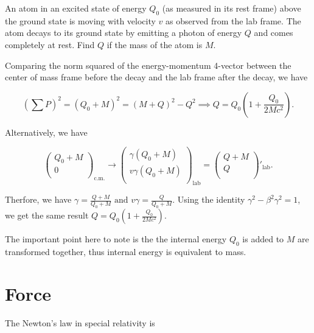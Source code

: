 \documentclass[english,a4paper,12pt]{report}
\begin{document}
{An atom in an excited state of energy \(Q_0 \) (as measured in its rest frame) above the ground state is moving with velocity \(v\) as observed from the lab frame. The atom decays to its ground state by emitting a photon of energy \(Q\) and comes completely at rest. Find \(Q\) if the mass of the atom is \(M\).}
{Comparing the norm squared of the energy-momentum 4-vector between the center of mass frame before the decay and the lab frame after the decay, we have

\begin{equation}
    \left( \sum P \right)^2 = (Q_0 + M)^2 = (M + Q)^2 - Q^2 \implies Q = Q_0 \left( 1 + \frac{Q_0 }{2Mc^2} \right).
\end{equation}

Alternatively, we have

\begin{equation}
    \begin{pmatrix}
         Q_0 + M \\
         0 \\
    \end{pmatrix}_{\text{c.m.} }  \rightarrow \begin{pmatrix}
         \gamma (Q_0 + M) \\
         v \gamma (Q_0 + M) \\
    \end{pmatrix}_{\text{lab} } = \begin{pmatrix}
         Q + M \\
         Q \\
    \end{pmatrix}'_{\text{lab} }.
\end{equation}

Therfore, we have \(\gamma = \frac{Q+M}{Q_0 + M} \text { and } v\gamma = \frac{Q}{Q_0 + M}\). Using the identity \(\gamma ^2- \beta ^2\gamma ^2 = 1\), we get the same result \(Q = Q_0 \left( 1 + \frac{Q_0 }{2Mc^2} \right)\).

The important point here to note is the the internal energy \(Q_0 \) is added to \(M\) are transformed together, thus internal energy is equivalent to mass.  
} 



\section{Force}

The Newton's law in special relativity is 
\end{document}
